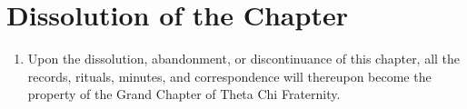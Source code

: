 \section{Dissolution of the Chapter}
	\begin{enumerate}
		\item Upon the dissolution, abandonment, or discontinuance of this chapter, all the records, rituals, minutes, and correspondence will thereupon become the property of the Grand Chapter of Theta Chi Fraternity.
	\end{enumerate}

